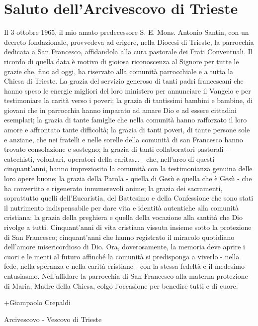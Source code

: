 \chapter*{Saluto dell’Arcivescovo di Trieste}
Il 3 ottobre 1965, il mio amato predecessore S. E. Mons. Antonio Santin, con un decreto  
fondazionale, provvedeva ad erigere, nella Diocesi di Trieste, la parrocchia dedicata a San 
Francesco, affidandola alla cura pastorale dei Frati Conventuali. Il ricordo di quella data è motivo di 
gioiosa riconoscenza al Signore per tutte le grazie che, fino ad oggi, ha riservato alla comunità 
parrocchiale e a tutta la Chiesa di Trieste. La grazia del servizio generoso di tanti padri francescani 
che hanno speso le energie migliori del loro ministero per annunciare il Vangelo e per testimoniare 
la carità verso i poveri; la grazia di tantissimi bambini e bambine, di giovani che in parrocchia 
hanno imparato ad amare Dio e ad essere cittadini esemplari; la grazia di tante famiglie che nella 
comunità hanno rafforzato il loro amore e affrontato tante difficoltà; la grazia di tanti poveri, di 
tante persone sole e anziane, che nei fratelli e nelle sorelle della comunità di  san Francesco  hanno 
trovato consolazione e sostegno; la grazia di tanti collaboratori pastorali – catechisti, volontari, 
operatori della caritas… - che, nell’arco di questi cinquant’anni, hanno impreziosito la comunità 
con la testimonianza genuina delle loro opere buone; la grazia della Parola - quella di Gesù e quella 
che è Gesù - che ha convertito e rigenerato innumerevoli anime; la grazia dei sacramenti, soprattutto 
quelli dell’Eucaristia, del Battesimo e della Confessione che sono stati il nutrimento indispensabile 
per dare vita e identità autentiche alla comunità cristiana; la grazia della preghiera e quella della 
vocazione alla santità che Dio rivolge a tutti.
Cinquant’anni di vita cristiana vissuta insieme sotto la protezione di San Francesco; 
cinquant’anni che hanno registrato il miracolo quotidiano dell’amore misericordioso di Dio. Ora, 
doverosamente, la memoria deve aprire i cuori e le menti al futuro affinché la comunità si 
predisponga a viverlo - nella fede, nella speranza e nella carità cristiane - con la stessa fedeltà e il 
medesimo entusiasmo.
Nell’affidare la parrocchia di San Francesco alla materna protezione di Maria, Madre della 
Chiesa, colgo l’occasione per benedire tutti e di cuore.
\begin{flushright}
+Giampaolo Crepaldi\par
Arcivescovo - Vescovo di Trieste
\end{flushright}
